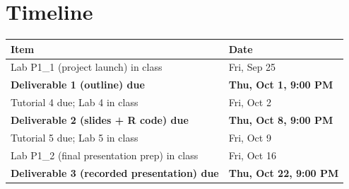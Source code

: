 \documentclass[12pt]{article}
\begin{document}
\section*{Timeline}
\begin{center}
\begin{tabular}{ll}
\toprule
\textbf{Item} & \textbf{Date} \\
\midrule
Lab P1\_1 (project launch) in class & Fri, Sep 25 \\
\textbf{Deliverable 1 (outline) due} & \textbf{Thu, Oct 1, 9:00 PM} \\
Tutorial 4 due; Lab 4 in class & Fri, Oct 2 \\
\textbf{Deliverable 2 (slides + R code) due} & \textbf{Thu, Oct 8, 9:00 PM} \\
Tutorial 5 due; Lab 5 in class & Fri, Oct 9 \\
Lab P1\_2 (final presentation prep) in class & Fri, Oct 16 \\
\textbf{Deliverable 3 (recorded presentation) due} & \textbf{Thu, Oct 22, 9:00 PM} \\
\bottomrule
\end{tabular}
\end{center}
\end{document}
